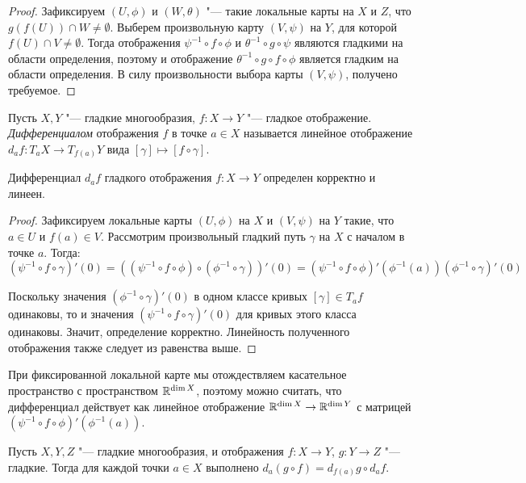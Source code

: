 \begin{proof}
	Зафиксируем $(U, \phi)$ и $(W, \theta)$ "--- такие локальные карты на $X$ и $Z$, что $g(f(U)) \cap W \ne \emptyset$. Выберем произвольную карту $(V, \psi)$ на $Y$, для которой $f(U) \cap V \ne \emptyset$. Тогда отображения $\psi^{-1} \circ f \circ \phi$ и $\theta^{-1} \circ g \circ \psi$ являются гладкими на области определения, поэтому и отображение $\theta^{-1} \circ g \circ f \circ \phi$ является гладким на области определения. В силу произвольности выбора карты $(V, \psi)$, получено требуемое.
\end{proof}

\begin{definition}
	Пусть $X, Y$ "--- гладкие многообразия, $f : X \to Y$ "--- гладкое отображение. \textit{Дифференциалом} отображения $f$ в точке $a \in X$ называется линейное отображение $d_af: T_aX \to T_{f(a)}Y$ вида $[\gamma] \mapsto [f \circ \gamma]$.
\end{definition}

\begin{proposition}
	Дифференциал $d_af$ гладкого отображения $f: X \to Y$ определен корректно и линеен.
\end{proposition}

\begin{proof}
	Зафиксируем локальные карты $(U, \phi)$ на $X$ и $(V, \psi)$ на $Y$ такие, что $a \in U$ и $f(a) \in V$. Рассмотрим произвольный гладкий путь $\gamma$ на $X$ с началом в точке $a$. Тогда:
	\[(\psi^{-1} \circ f \circ \gamma)'(0) = \left((\psi^{-1} \circ f \circ \phi) \circ (\phi^{-1} \circ \gamma)\right)'(0) = (\psi^{-1} \circ f \circ \phi)'(\phi^{-1}(a))(\phi^{-1} \circ \gamma)'(0)\]
	
	Поскольку значения $(\phi^{-1} \circ \gamma)'(0)$ в одном классе кривых $[\gamma] \in T_af$ одинаковы, то и значения $(\psi^{-1} \circ f \circ \gamma)'(0)$ для кривых этого класса одинаковы. Значит, определение корректно. Линейность полученного отображения также следует из равенства выше.
\end{proof}

\begin{note}
	При фиксированной локальной карте мы отождествляем касательное пространство с пространством $\mathbb{R}^{\dim{X}}$, поэтому можно считать, что дифференциал действует как линейное отображение $\mathbb{R}^{\dim{X}} \to \mathbb{R}^{\dim{Y}}$ с матрицей $(\psi^{-1} \circ f \circ \phi)'(\phi^{-1}(a))$.
\end{note}

\begin{proposition}
	Пусть $X, Y, Z$ "--- гладкие многообразия, и отображения $f : X \to Y$, $g : Y \to Z$ "--- гладкие. Тогда для каждой точки $a \in X$ выполнено $d_a(g\circ f) = d_{f(a)}g \circ d_af$.
\end{proposition}

